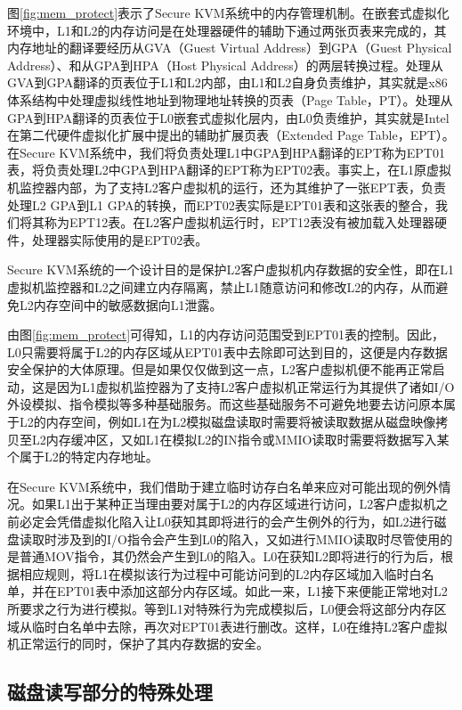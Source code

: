 图\ref{fig:mem_protect}表示了Secure KVM系统中的内存管理机制。在嵌套式虚拟化环境中，L1和L2的内存访问是在处理器硬件的辅助下通过两张页表来完成的，其内存地址的翻译要经历从GVA（Guest Virtual Address）到GPA（Guest Physical Address）、和从GPA到HPA（Host Physical Address）的两层转换过程。处理从GVA到GPA翻译的页表位于L1和L2内部，由L1和L2自身负责维护，其实就是x86体系结构中处理虚拟线性地址到物理地址转换的页表（Page Table，PT）。处理从GPA到HPA翻译的页表位于L0嵌套式虚拟化层内，由L0负责维护，其实就是Intel在第二代硬件虚拟化扩展中提出的辅助扩展页表（Extended Page Table，EPT）。在Secure KVM系统中，我们将负责处理L1中GPA到HPA翻译的EPT称为EPT01表，将负责处理L2中GPA到HPA翻译的EPT称为EPT02表。事实上，在L1原虚拟机监控器内部，为了支持L2客户虚拟机的运行，还为其维护了一张EPT表，负责处理L2 GPA到L1 GPA的转换，而EPT02表实际是EPT01表和这张表的整合，我们将其称为EPT12表。在L2客户虚拟机运行时，EPT12表没有被加载入处理器硬件，处理器实际使用的是EPT02表。

Secure KVM系统的一个设计目的是保护L2客户虚拟机内存数据的安全性，即在L1虚拟机监控器和L2之间建立内存隔离，禁止L1随意访问和修改L2的内存，从而避免L2内存空间中的敏感数据向L1泄露。

由图\ref{fig:mem_protect}可得知，L1的内存访问范围受到EPT01表的控制。因此，L0只需要将属于L2的内存区域从EPT01表中去除即可达到目的，这便是内存数据安全保护的大体原理。但是如果仅仅做到这一点，L2客户虚拟机便不能再正常启动，这是因为L1虚拟机监控器为了支持L2客户虚拟机正常运行为其提供了诸如I/O外设模拟、指令模拟等多种基础服务。而这些基础服务不可避免地要去访问原本属于L2的内存空间，例如L1在为L2模拟磁盘读取时需要将被读取数据从磁盘映像拷贝至L2内存缓冲区，又如L1在模拟L2的IN指令或MMIO读取时需要将数据写入某个属于L2的特定内存地址。

在Secure KVM系统中，我们借助于建立临时访存白名单来应对可能出现的例外情况。如果L1出于某种正当理由要对属于L2的内存区域进行访问，L2客户虚拟机之前必定会凭借虚拟化陷入让L0获知其即将进行的会产生例外的行为，如L2进行磁盘读取时涉及到的I/O指令会产生到L0的陷入，又如进行MMIO读取时尽管使用的是普通MOV指令，其仍然会产生到L0的陷入。L0在获知L2即将进行的行为后，根据相应规则，将L1在模拟该行为过程中可能访问到的L2内存区域加入临时白名单，并在EPT01表中添加这部分内存区域。如此一来，L1接下来便能正常地对L2所要求之行为进行模拟。等到L1对特殊行为完成模拟后，L0便会将这部分内存区域从临时白名单中去除，再次对EPT01表进行删改。这样，L0在维持L2客户虚拟机正常运行的同时，保护了其内存数据的安全。

\subsection{磁盘读写部分的特殊处理}

